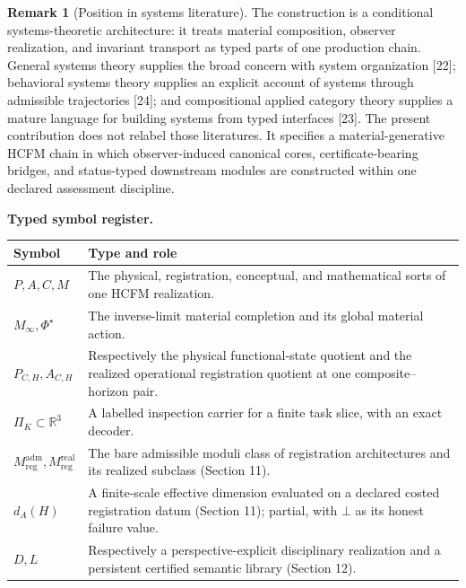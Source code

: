 \documentclass[11pt]{article}
\theoremstyle{definition}
\newtheorem{remark}{Remark}
\newcommand{\Minf}{M_\infty}
\begin{document}
\begin{remark}[Position in systems literature]
The construction is a conditional systems-theoretic architecture: it treats material composition, observer realization, and invariant transport as typed parts of one production chain. General systems theory supplies the broad concern with system organization [22]; behavioral systems theory supplies an explicit account of systems through admissible trajectories [24]; and compositional applied category theory supplies a mature language for building systems from typed interfaces [23]. The present contribution does not relabel those literatures. It specifies a material-generative HCFM chain in which observer-induced canonical cores, certificate-bearing bridges, and status-typed downstream modules are constructed within one declared assessment discipline.
\end{remark}

\noindent\textbf{Typed symbol register.}

\begin{center}
\begin{tabular}{@{}p{}p{}@{}}
\toprule
Symbol & Type and role\\
\midrule
$P, A, C, M$ & The physical, registration, conceptual, and mathematical sorts of one HCFM realization.\\
$\Minf, \Phi^{\star}$ & The inverse-limit material completion and its global material action.\\
$P_{C,H}, A_{C,H}$ & Respectively the physical functional-state quotient and the realized operational registration quotient at one composite--horizon pair.\\
$\Pi_K \subset \mathbb{R}^3$ & A labelled inspection carrier for a finite task slice, with an exact decoder.\\
$M^{\mathrm{adm}}_{\mathrm{reg}}, M^{\mathrm{real}}_{\mathrm{reg}}$ & The bare admissible moduli class of registration architectures and its realized subclass (Section 11).\\
$d_A(H)$ & A finite-scale effective dimension evaluated on a declared costed registration datum (Section 11); partial, with $\bot$ as its honest failure value.\\
$D, L$ & Respectively a perspective-explicit disciplinary realization and a persistent certified semantic library (Section 12).\\
\bottomrule
\end{tabular}
\end{center}
\end{document}
